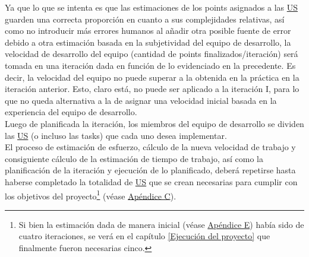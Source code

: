 \documentclass[a4paper, 12pt,twoside]{report}  %
\numberwithin{equation}{subsection} %
\begin{document}
\indent Ya que lo que se intenta es que las estimaciones de los points asignados a las \hyperlink{US}{US} guarden una correcta proporción en cuanto a sus complejidades relativas, así como no introducir más errores humanos al añadir otra posible fuente de error debido a otra estimación basada en la subjetividad del equipo de desarrollo, la velocidad de desarrollo del equipo (cantidad de points finalizados/iteración) será tomada en una iteración dada en función de lo evidenciado en la precedente. Es decir, la velocidad del equipo no puede superar a la obtenida en la práctica en la iteración anterior. Esto, claro está, no puede ser aplicado a la iteración I, para lo que no queda alternativa a la de asignar una velocidad inicial basada en la experiencia del equipo de desarrollo.\\
\indent Luego de planificada la iteración, los miembros del equipo de desarrollo se dividen las \hyperlink{US}{US} (o incluso las tasks) que cada uno desea implementar.\\
\indent El proceso de estimación de esfuerzo, cálculo de la nueva velocidad de trabajo y consiguiente cálculo de la estimación de tiempo de trabajo, así como la planificación de la iteración y ejecución de lo planificado, deberá repetirse hasta haberse completado la totalidad de \hyperlink{US}{US} que se crean necesarias para cumplir con los objetivos del proyecto\renewcommand*{\thefootnote}{\fnsymbol{footnote}}\footnote[1]{Si bien la estimación dada de manera inicial (véase \hyperlink{apendice_e}{Apéndice E}) había sido de cuatro iteraciones, se verá en el capítulo \ref{Ejecución del proyecto} que finalmente fueron necesarias cinco.}\renewcommand*{\thefootnote}{\arabic{footnote}} (véase \hyperlink{apendice_c}{Apéndice C}).
\end{document}

